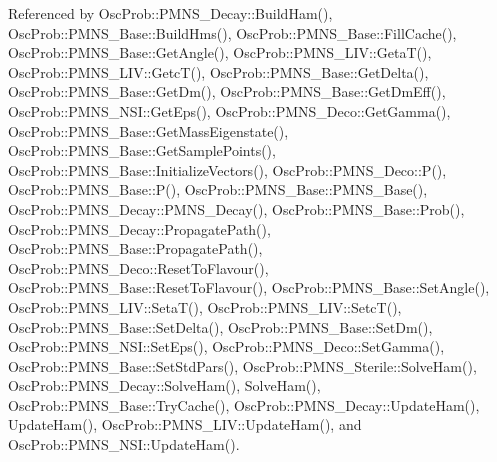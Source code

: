 Referenced by Osc\+Prob\+::\+P\+M\+N\+S\+\_\+\+Decay\+::\+Build\+Ham(), Osc\+Prob\+::\+P\+M\+N\+S\+\_\+\+Base\+::\+Build\+Hms(), Osc\+Prob\+::\+P\+M\+N\+S\+\_\+\+Base\+::\+Fill\+Cache(), Osc\+Prob\+::\+P\+M\+N\+S\+\_\+\+Base\+::\+Get\+Angle(), Osc\+Prob\+::\+P\+M\+N\+S\+\_\+\+L\+I\+V\+::\+Geta\+T(), Osc\+Prob\+::\+P\+M\+N\+S\+\_\+\+L\+I\+V\+::\+Getc\+T(), Osc\+Prob\+::\+P\+M\+N\+S\+\_\+\+Base\+::\+Get\+Delta(), Osc\+Prob\+::\+P\+M\+N\+S\+\_\+\+Base\+::\+Get\+Dm(), Osc\+Prob\+::\+P\+M\+N\+S\+\_\+\+Base\+::\+Get\+Dm\+Eff(), Osc\+Prob\+::\+P\+M\+N\+S\+\_\+\+N\+S\+I\+::\+Get\+Eps(), Osc\+Prob\+::\+P\+M\+N\+S\+\_\+\+Deco\+::\+Get\+Gamma(), Osc\+Prob\+::\+P\+M\+N\+S\+\_\+\+Base\+::\+Get\+Mass\+Eigenstate(), Osc\+Prob\+::\+P\+M\+N\+S\+\_\+\+Base\+::\+Get\+Sample\+Points(), Osc\+Prob\+::\+P\+M\+N\+S\+\_\+\+Base\+::\+Initialize\+Vectors(), Osc\+Prob\+::\+P\+M\+N\+S\+\_\+\+Deco\+::\+P(), Osc\+Prob\+::\+P\+M\+N\+S\+\_\+\+Base\+::\+P(), Osc\+Prob\+::\+P\+M\+N\+S\+\_\+\+Base\+::\+P\+M\+N\+S\+\_\+\+Base(), Osc\+Prob\+::\+P\+M\+N\+S\+\_\+\+Decay\+::\+P\+M\+N\+S\+\_\+\+Decay(), Osc\+Prob\+::\+P\+M\+N\+S\+\_\+\+Base\+::\+Prob(), Osc\+Prob\+::\+P\+M\+N\+S\+\_\+\+Decay\+::\+Propagate\+Path(), Osc\+Prob\+::\+P\+M\+N\+S\+\_\+\+Base\+::\+Propagate\+Path(), Osc\+Prob\+::\+P\+M\+N\+S\+\_\+\+Deco\+::\+Reset\+To\+Flavour(), Osc\+Prob\+::\+P\+M\+N\+S\+\_\+\+Base\+::\+Reset\+To\+Flavour(), Osc\+Prob\+::\+P\+M\+N\+S\+\_\+\+Base\+::\+Set\+Angle(), Osc\+Prob\+::\+P\+M\+N\+S\+\_\+\+L\+I\+V\+::\+Seta\+T(), Osc\+Prob\+::\+P\+M\+N\+S\+\_\+\+L\+I\+V\+::\+Setc\+T(), Osc\+Prob\+::\+P\+M\+N\+S\+\_\+\+Base\+::\+Set\+Delta(), Osc\+Prob\+::\+P\+M\+N\+S\+\_\+\+Base\+::\+Set\+Dm(), Osc\+Prob\+::\+P\+M\+N\+S\+\_\+\+N\+S\+I\+::\+Set\+Eps(), Osc\+Prob\+::\+P\+M\+N\+S\+\_\+\+Deco\+::\+Set\+Gamma(), Osc\+Prob\+::\+P\+M\+N\+S\+\_\+\+Base\+::\+Set\+Std\+Pars(), Osc\+Prob\+::\+P\+M\+N\+S\+\_\+\+Sterile\+::\+Solve\+Ham(), Osc\+Prob\+::\+P\+M\+N\+S\+\_\+\+Decay\+::\+Solve\+Ham(), Solve\+Ham(), Osc\+Prob\+::\+P\+M\+N\+S\+\_\+\+Base\+::\+Try\+Cache(), Osc\+Prob\+::\+P\+M\+N\+S\+\_\+\+Decay\+::\+Update\+Ham(), Update\+Ham(), Osc\+Prob\+::\+P\+M\+N\+S\+\_\+\+L\+I\+V\+::\+Update\+Ham(), and Osc\+Prob\+::\+P\+M\+N\+S\+\_\+\+N\+S\+I\+::\+Update\+Ham().

\mbox{\label{classOscProb_1_1PMNS__Base_a69db9d57e12fc7cbe0431bc6c18fac93}} 
